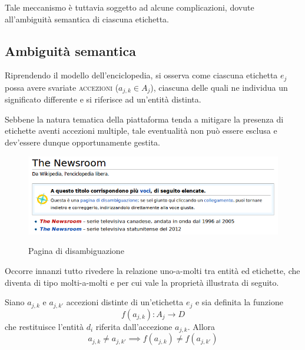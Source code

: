 Tale meccanismo è tuttavia soggetto ad alcune complicazioni, dovute all'ambiguità semantica di ciascuna etichetta.

\subsection{Ambiguità semantica}
Riprendendo il modello dell'enciclopedia, si osserva come ciascuna etichetta $e_j$ possa avere svariate \textsc{accezioni} ($a_{j,k} \in A_j$), ciascuna delle quali ne individua un significato differente e si riferisce ad un'entità distinta.

Sebbene la natura tematica della piattaforma tenda a mitigare la presenza di etichette aventi accezioni multiple, tale eventualità non può essere esclusa e dev'essere dunque opportunamente gestita.

\begin{figure}[ht]
	\begin{center}
		\includegraphics[width=12cm]{disambigua.png}
		\label{fig:tesi:stage:classificazione:disambiguazione}
		\caption{Pagina di disambiguazione \cite{wiki:disambigua}}
	\end{center}
\end{figure}

Occorre innanzi tutto rivedere la relazione uno-a-molti tra entità ed etichette, che diventa di tipo molti-a-molti e per cui vale la proprietà illustrata di seguito.

Siano $a_{j,k}$ e $a_{j,k'}$ accezioni distinte di un'etichetta $e_j$ e sia definita la funzione
\begin{equation}
f(a_{j,k}): A_j \rightarrow D
\end{equation}
che restituisce l'entità $d_i$ riferita dall'accezione $a_{j,k}$. Allora
\begin{equation}
a_{j,k} \neq a_{j,k'} \implies f(a_{j,k}) \neq f(a_{j,k'})
\end{equation}

